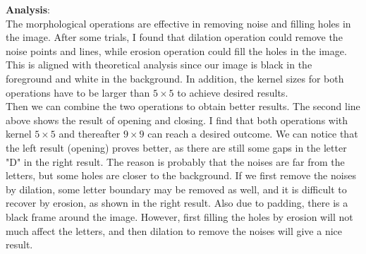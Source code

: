 \documentclass[UTF8]{ctexart}
\begin{document}
\textbf{Analysis}:\\
The morphological operations are effective in removing noise and filling holes in the image.
After some trials, I found that dilation operation could remove the noise points and lines,
while erosion operation could fill the holes in the image. This is aligned with theoretical analysis since
our image is black in the foreground and white in the background.
In addition, the kernel sizes for both operations have to be larger than $5 \times 5$ to achieve desired results.\\
Then we can combine the two operations to obtain better results. The second line above shows the result of opening and closing.
I find that both operations with kernel $5\times 5$ and thereafter $9\times 9$ can reach a desired outcome.
We can notice that the left result (opening) proves better, as there are still some gaps in the letter "D" in the right result.
The reason is probably that the noises are far from the letters, but some holes are closer to the background.
If we first remove the noises by dilation, some letter boundary may be removed as well, and it is difficult to recover by erosion,
as shown in the right result. Also due to padding, there is a black frame around the image. However, first filling the holes by erosion
will not much affect the letters, and then dilation to remove the noises will give a nice result.
\end{document}
